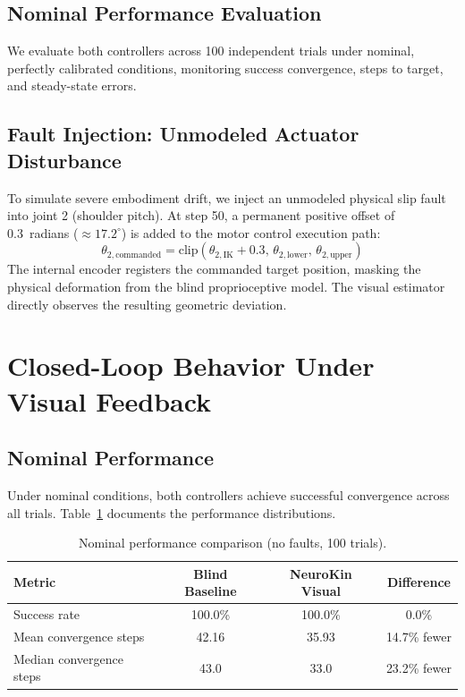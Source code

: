 \documentclass[12pt,a4paper,oneside]{report}
\begin{document}
\subsection{Nominal Performance Evaluation}
We evaluate both controllers across 100 independent trials under nominal, perfectly calibrated conditions, monitoring success convergence, steps to target, and steady-state errors.

\subsection{Fault Injection: Unmodeled Actuator Disturbance}
To simulate severe embodiment drift, we inject an unmodeled physical slip fault into joint 2 (shoulder pitch). At step 50, a permanent positive offset of 0.3~radians ($\approx 17.2^\circ$) is added to the motor control execution path:
\begin{equation}
\theta_{2,\text{commanded}} = \text{clip}(\theta_{2,\text{IK}} + 0.3, \, \theta_{2,\text{lower}}, \, \theta_{2,\text{upper}})
\end{equation}
The internal encoder registers the commanded target position, masking the physical deformation from the blind proprioceptive model. The visual estimator directly observes the resulting geometric deviation.

\section{Closed-Loop Behavior Under Visual Feedback}
\label{sec:closed_loop_behavior}

\subsection{Nominal Performance}
Under nominal conditions, both controllers achieve successful convergence across all trials. Table~\ref{tab:nominal_performance} documents the performance distributions.

\begin{table}[H]
\centering
\caption{Nominal performance comparison (no faults, 100 trials).}
\label{tab:nominal_performance}
\begin{tabular}{lccc}
\toprule
\textbf{Metric} & \textbf{Blind Baseline} & \textbf{NeuroKin Visual} & \textbf{Difference} \\
\midrule
Success rate & 100.0\% & 100.0\% & 0.0\% \\
Mean convergence steps & 42.16 & 35.93 & 14.7\% fewer \\
Median convergence steps & 43.0 & 33.0 & 23.2\% fewer \\
\bottomrule
\end{tabular}
\end{table}
\end{document}
